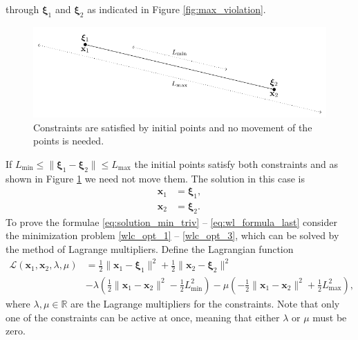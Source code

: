 through $\boldsymbol{\xi}_1$ and $\boldsymbol{\xi}_2$ as 
indicated in Figure \ref{fig:max_violation}.\\
%
\begin{figure}[H]
	\centering
	\includegraphics[]{figures/constraint_handling/well_length_feasible.pdf}
	\caption{Constraints are satisfied by initial points and no movement of the points is needed.}
	\label{fig:feasible}
\end{figure}
%
If $L_{\min} \leq \| \boldsymbol{\xi}_1 - \boldsymbol{\xi}_2 \| \leq L_{\max}$ the initial points
satisfy both constraints and as shown in 
Figure \ref{fig:feasible} we need not move them. 
The solution in this case is
\begin{equation}
\begin{aligned}
\textbf{x}_1 &= \boldsymbol{\xi}_1, \\
\textbf{x}_2 &= \boldsymbol{\xi}_2.
\label{eq:wl_formula_last}
\end{aligned}
\end{equation}
%
%
To prove the formulae \eqref{eq:solution_min_triv} -- \eqref{eq:wl_formula_last} 
consider the minimization problem \eqref{wlc_opt_1} -- \eqref{wlc_opt_3}, which can be 
solved by the method of Lagrange multipliers. Define the Lagrangian function
%
\begin{equation}
\begin{aligned}
\mathcal{L} (\textbf{x}_1,\textbf{x}_2,\lambda,\mu) &= \frac{1}{2} \| \textbf{x}_1 - \boldsymbol{\xi}_1 \|^2 + \frac{1}{2} \| \textbf{x}_2 - \boldsymbol{\xi}_2 \|^2 \\
&- \lambda \left( \frac{1}{2} \| \textbf{x}_1 - \textbf{x}_2 \|^2 - \frac{1}{2} L_{\min}^2 \right ) - \mu  \left( - \frac{1}{2} \| \textbf{x}_1 - \textbf{x}_2 \|^2 + \frac{1}{2} L_{\max}^2 \right ),
\end{aligned}
\label{lagrangeFunc}
\end{equation}
%
where $\lambda, \mu \in \mathbb{R}$ are the Lagrange multipliers for the constraints.
Note that only one of the constraints can be active at once, meaning that either $\lambda$
or $\mu$ must be zero.\\
